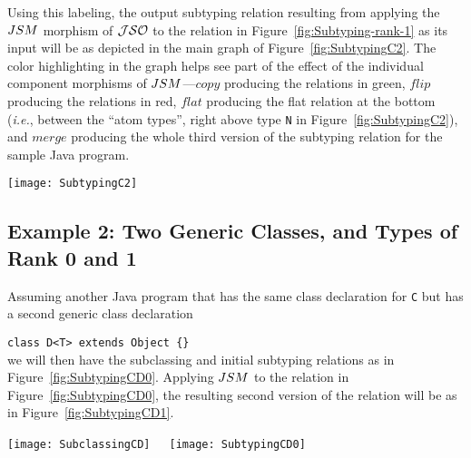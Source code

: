 \documentclass[twocolumn,english]{article}
\numberwithin{equation}{section}
\numberwithin{figure}{section}
\newcommand{\code}[1]{\texttt{#1}}
\begin{document}
Using this labeling, the output subtyping relation resulting from
applying the $JSM$ morphism of $\mathcal{JSO}$ to the relation in Figure~\ref{fig:Subtyping-rank-1}
as its input will be as depicted in the main graph of Figure~\ref{fig:SubtypingC2}.
The color highlighting in the graph helps see part of the effect of
the individual component morphisms of $JSM$---$copy$ producing
the relations in green, $flip$ producing the relations in red, $flat$
producing the flat relation at the bottom (\emph{i.e.}, between the
``atom types'', right above type \code{N} in Figure~\ref{fig:SubtypingC2}),
and $merge$ producing the whole third version of the subtyping relation
for the sample Java program.

\begin{figure*}
\noindent \begin{centering}
\texttt{[image: SubtypingC2]}
\par\end{centering}

\protect\caption{\label{fig:SubtypingC2}Subtyping between rank 0, 1 and 2 types (with
one generic class)}
\end{figure*}



\subsection{Example 2: Two Generic Classes, and Types of Rank 0 and 1}

Assuming another Java program that has the same class declaration
for \code{C} but has a second generic class declaration

\code{class D<T> extends Object \{\}}\\
we will then have the subclassing and initial subtyping relations
as in Figure~\ref{fig:SubtypingCD0}. Applying $JSM$ to the relation
in Figure~\ref{fig:SubtypingCD0}, the resulting second version of
the relation will be as in Figure~\ref{fig:SubtypingCD1}.

\begin{figure*}
\noindent \begin{centering}
\texttt{[image: SubclassingCD]}~~~\texttt{[image: SubtypingCD0]}
\par\end{centering}

\protect\caption{\label{fig:SubtypingCD0}Subclassing and subtyping between rank 0
types (with two generic classes)}
\end{figure*}
\end{document}
